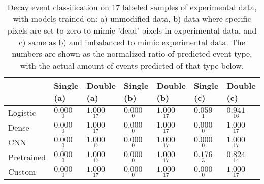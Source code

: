 \begin{table}
\centering
\caption{
Decay event classification on 17 labeled samples of experimental data, with models trained on:
a) unmodified data, b) data where specific pixels are set to zero to mimic
'dead' pixels in experimental data, and c) same as b) and imbalanced to mimic experimental data.
The numbers are shown as the normalized ratio of predicted event type, with the actual amount of
events predicted of that type below.
}
\label{tab:classification-experimental-labeled-doubles}
\begin{tabular}{lllllll}
\toprule
{} &                                Single (a) &                                 Double (a) &                                Single (b) &                                 Double (b) &                                Single (c) &                                 Double (c) \\
\midrule
Logistic   &  $\underset{\num{ 0 }  }{\num{ 0.000 } }$ &  $\underset{\num{ 17 }  }{\num{ 1.000 } }$ &  $\underset{\num{ 0 }  }{\num{ 0.000 } }$ &  $\underset{\num{ 17 }  }{\num{ 1.000 } }$ &  $\underset{\num{ 1 }  }{\num{ 0.059 } }$ &  $\underset{\num{ 16 }  }{\num{ 0.941 } }$ \\
Dense      &  $\underset{\num{ 0 }  }{\num{ 0.000 } }$ &  $\underset{\num{ 17 }  }{\num{ 1.000 } }$ &  $\underset{\num{ 0 }  }{\num{ 0.000 } }$ &  $\underset{\num{ 17 }  }{\num{ 1.000 } }$ &  $\underset{\num{ 0 }  }{\num{ 0.000 } }$ &  $\underset{\num{ 17 }  }{\num{ 1.000 } }$ \\
CNN        &  $\underset{\num{ 0 }  }{\num{ 0.000 } }$ &  $\underset{\num{ 17 }  }{\num{ 1.000 } }$ &  $\underset{\num{ 0 }  }{\num{ 0.000 } }$ &  $\underset{\num{ 17 }  }{\num{ 1.000 } }$ &  $\underset{\num{ 0 }  }{\num{ 0.000 } }$ &  $\underset{\num{ 17 }  }{\num{ 1.000 } }$ \\
Pretrained &  $\underset{\num{ 0 }  }{\num{ 0.000 } }$ &  $\underset{\num{ 17 }  }{\num{ 1.000 } }$ &  $\underset{\num{ 0 }  }{\num{ 0.000 } }$ &  $\underset{\num{ 17 }  }{\num{ 1.000 } }$ &  $\underset{\num{ 3 }  }{\num{ 0.176 } }$ &  $\underset{\num{ 14 }  }{\num{ 0.824 } }$ \\
Custom     &  $\underset{\num{ 0 }  }{\num{ 0.000 } }$ &  $\underset{\num{ 17 }  }{\num{ 1.000 } }$ &  $\underset{\num{ 0 }  }{\num{ 0.000 } }$ &  $\underset{\num{ 17 }  }{\num{ 1.000 } }$ &  $\underset{\num{ 0 }  }{\num{ 0.000 } }$ &  $\underset{\num{ 17 }  }{\num{ 1.000 } }$ \\
\bottomrule
\end{tabular}
\end{table}
